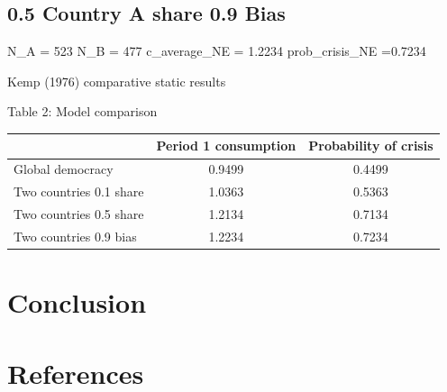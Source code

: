 \documentclass[11pt,preprint, authoryear]{elsarticle}
\numberwithin{equation}{section}
\numberwithin{figure}{section}
\numberwithin{table}{section}
\begin{document}
\hypertarget{country-a-share-0.9-bias}{%
\subsection*{0.5 Country A share 0.9
Bias}\label{country-a-share-0.9-bias}}

N\_A = 523 N\_B = 477 c\_average\_NE = 1.2234 prob\_crisis\_NE =0.7234

Kemp (1976) comparative static results

\begin{center}
Table 2: Model comparison
\end{center}

\begin{longtable}[]{@{}lcc@{}}
\toprule()
& Period 1 consumption & Probability of crisis \\
\midrule()
\endhead
Global democracy & 0.9499 & 0.4499 \\
Two countries 0.1 share & 1.0363 & 0.5363 \\
Two countries 0.5 share & 1.2134 & 0.7134 \\
Two countries 0.9 bias & 1.2234 & 0.7234 \\
\bottomrule()
\end{longtable}

\hypertarget{conclusion}{%
\section{Conclusion}\label{conclusion}}

\newpage

\hypertarget{references}{%
\section*{References}\label{references}}


\end{document}
